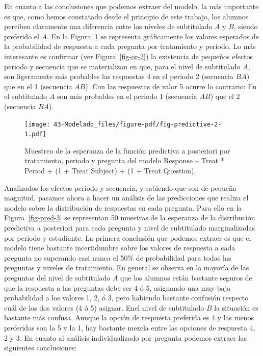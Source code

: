 \documentclass[
  12pt,
  a4paper,
  extrafontsizes,
  onecolumn,
  openright]{memoir}
\begin{document}
En cuanto a las conclusiones que podemos extraer del modelo, la más
importante es que, como hemos constatado desde el principio de este
trabajo, los alumnos perciben claramente una diferencia entre los
niveles de subtitulado \(A\) y \(B\), siendo preferido el \(A\). En la
Figura~\ref{fig-predictive-2} se representa gráficamente los valores
esperados de la probabilidad de respuesta a cada pregunta por
tratamiento y periodo. Lo más interesante es confirmar (ver
Figura~\ref{fig-or-2}) la existencia de pequeños efectos periodo y
secuencia que se materializan en que, para el nivel de subtitulado
\(A\), son ligeramente más probables las respuestas 4 en el periodo 2
(secuencia \(BA\)) que en el 1 (secuencia \(AB\)). Con las respuestas de
valor 5 ocurre lo contrario: En el subtitulado \(A\) son más probables
en el periodo 1 (secuencia \(AB\)) que el 2 (secuencia \(BA\)).

\begin{figure}[h]

{\centering \texttt{[image: 43-Modelado\_files/figure-pdf/fig-predictive-2-1.pdf]}

}

\caption{\label{fig-predictive-2}Muestreo de la esperanza de la función
predictiva a posteriori por tratamiento, periodo y pregunta del modelo
Response \textasciitilde{} Treat * Period + (1 + Treat \textbar{}
Subject) + (1 + Treat \textbar{} Question).}

\end{figure}

Analizados los efectos periodo y secuencia, y sabiendo que son de
pequeña magnitud, pasamos ahora a hacer un análisis de las predicciones
que realiza el modelo sobre la distribución de respuestas en cada
pregunta. Para ello en la Figura~\ref{fig-pred-3} se representan 50
muestras de la esperanza de la distribución predictiva a posteriori para
cada pregunta y nivel de subtitulado marginalizadas por periodo y
estudiante. La primera conclusión que podemos extraer es que el modelo
tiene bastante incertidumbre sobre los valores de respuesta a cada
pregunta no superando casi nunca el 50\% de probabilidad para todas las
preguntas y niveles de tratamiento. En general se observa en la mayoría
de las preguntas del nivel de subtitulado \(A\) que los alumnos están
bastante seguros de que la respuesta a las preguntas debe ser 4 ó 5,
asignando una muy baja probabilidad a los valores 1, 2, ó 3, pero
habiendo bastante confusión respecto cuál de los dos valores (4 ó 5)
asignar. Enel nivel de subtitulado \(B\) la situación es bastante más
confusa. Aunque la opción de respuesta preferida es 4 y las menos
preferidas son la 5 y la 1, hay bastante mezcla entre las opciones de
respuesta 4, 2 y 3. En cuanto al análisis individualizado por pregunta
podemos extraer las siguientes conclusiones:
\end{document}
